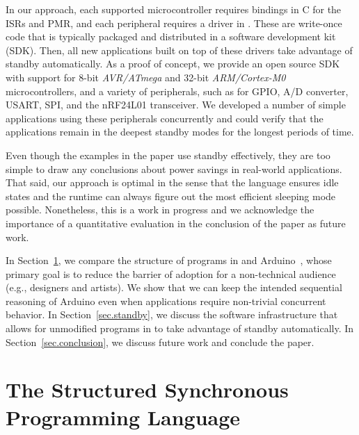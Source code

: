 In our approach, each supported microcontroller requires bindings in C for the
ISRs and PMR, and each peripheral requires a driver in \CEU.
These are write-once code that is typically packaged and distributed in a
software development kit (SDK).
%
Then, all new applications built on top of these drivers take advantage of
standby automatically.
%
As a proof of concept, we provide an open source SDK %
with support for 8-bit
\emph{AVR/ATmega} and 32-bit \emph{ARM/Cortex-M0} microcontrollers, and a
variety of peripherals, such as for GPIO, A/D converter, USART, SPI, and the
nRF24L01 transceiver.
%
We developed a number of simple applications using these peripherals
concurrently and could verify that the applications remain in the deepest
standby modes for the longest periods of time.

Even though the examples in the paper use standby effectively, they are too
simple to draw any conclusions about power savings in real-world applications.
That said, our approach is optimal in the sense that the language ensures idle
states and the runtime can always figure out the most efficient sleeping mode
possible.
Nonetheless, this is a work in progress and we acknowledge the importance of a
quantitative evaluation in the conclusion of the paper as future work.

In Section~\ref{sec.ceu}, we compare the structure of programs in \CEU and
Arduino~\cite{arduino.book}, whose primary goal is to reduce the barrier of
adoption for a non-technical audience (e.g., designers and artists).
We show that we can keep the intended sequential reasoning of Arduino even when
applications require non-trivial concurrent behavior.
%
In Section~\ref{sec.standby}, we discuss the software infrastructure that
allows for unmodified programs in \CEU to take advantage of standby
automatically.
%
In Section~\ref{sec.conclusion}, we discuss future work and conclude the paper.



\section{The Structured Synchronous Programming Language \CEU}
\label{sec.ceu}

